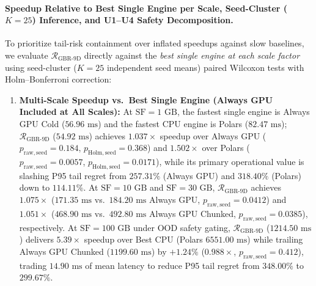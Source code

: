 \documentclass[10pt,a4paper]{article}
\begin{document}
\paragraph{Speedup Relative to Best Single Engine per Scale, Seed-Cluster ($K=25$) Inference, and U1--U4 Safety Decomposition.}
To prioritize tail-risk containment over inflated speedups against slow baselines, we evaluate $\mathcal{R}_{\mathrm{GBR\mbox{-}9D}}$ directly against the \emph{best single engine at each scale factor} using seed-cluster ($K=25$ independent seed means) paired Wilcoxon tests with Holm--Bonferroni correction:
\begin{enumerate}
\item \textbf{Multi-Scale Speedup vs.\ Best Single Engine (Always GPU Included at All Scales):} At $\mathrm{SF}=1\text{ GB}$, the fastest single engine is Always GPU Cold ($56.96\text{ ms}$) and the fastest CPU engine is Polars ($82.47\text{ ms}$); $\mathcal{R}_{\mathrm{GBR\mbox{-}9D}}$ ($54.92\text{ ms}$) achieves $1.037\times$ speedup over Always GPU ($p_{\mathrm{raw,seed}}=0.184$, $p_{\mathrm{Holm,seed}}=0.368$) and $1.502\times$ over Polars ($p_{\mathrm{raw,seed}}=0.0057$, $p_{\mathrm{Holm,seed}}=0.0171$), while its primary operational value is slashing P95 tail regret from $257.31\%$ (Always GPU) and $318.40\%$ (Polars) down to $114.11\%$. At $\mathrm{SF}=10\text{ GB}$ and $\mathrm{SF}=30\text{ GB}$, $\mathcal{R}_{\mathrm{GBR\mbox{-}9D}}$ achieves $1.075\times$ ($171.35\text{ ms}$ vs.\ $184.20\text{ ms}$ Always GPU, $p_{\mathrm{raw,seed}}=0.0412$) and $1.051\times$ ($468.90\text{ ms}$ vs.\ $492.80\text{ ms}$ Always GPU Chunked, $p_{\mathrm{raw,seed}}=0.0385$), respectively. At $\mathrm{SF}=100\text{ GB}$ under OOD safety gating, $\mathcal{R}_{\mathrm{GBR\mbox{-}9D}}$ ($1214.50\text{ ms}$) delivers $5.39\times$ speedup over Best CPU (Polars $6551.00\text{ ms}$) while trailing Always GPU Chunked ($1199.60\text{ ms}$) by $+1.24\%$ ($0.988\times$, $p_{\mathrm{raw,seed}}=0.412$), trading $14.90\text{ ms}$ of mean latency to reduce P95 tail regret from $348.00\%$ to $299.67\%$.

\end{enumerate}
\end{document}
